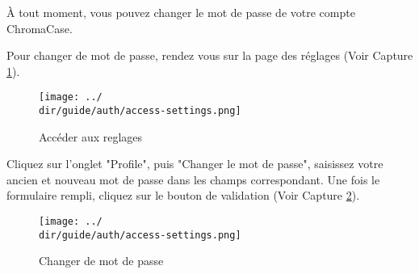 À tout moment, vous pouvez changer le mot de passe de votre compte ChromaCase.

Pour changer de mot de passe, rendez vous sur la page des réglages (Voir Capture \ref{fig:access-settings}).

\begin{figure}[H]
	\texttt{[image: ../\\dir/guide/auth/access-settings.png]}
	\caption{Accéder aux reglages}
	\label{fig:access-settings}
\end{figure}

Cliquez sur l'onglet "Profile", puis "Changer le mot de passe", saisissez votre ancien et nouveau mot de passe dans les champs correspondant. Une fois le formulaire rempli, cliquez sur le bouton de validation (Voir Capture \ref{fig:change-password}).

\begin{figure}[H]
	\texttt{[image: ../\\dir/guide/auth/access-settings.png]}
	\caption{Changer de mot de passe}
	\label{fig:change-password}
\end{figure}